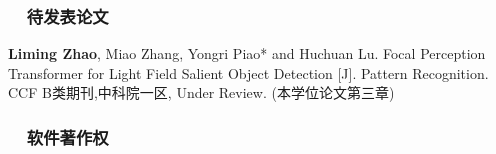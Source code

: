 
\begin{publications}


\subsubsection*{\textbf{~~待发表论文}}
\vspace{-10pt}
\begin{enumerate}[label={[\arabic*]}]
	
	
	\item
	\textbf{Liming Zhao}, Miao Zhang, Yongri Piao* and Huchuan Lu.
	Focal Perception Transformer for Light Field Salient Object Detection [J].
	Pattern Recognition.
	CCF B类期刊,中科院一区,
	Under Review.
	(本学位论文第三章)
\end{enumerate}


\subsubsection*{\textbf{~~软件著作权}}
\vspace{-10pt}
\begin{enumerate}[label={[\arabic*]}]
	

\end{enumerate}
\end{publications}
